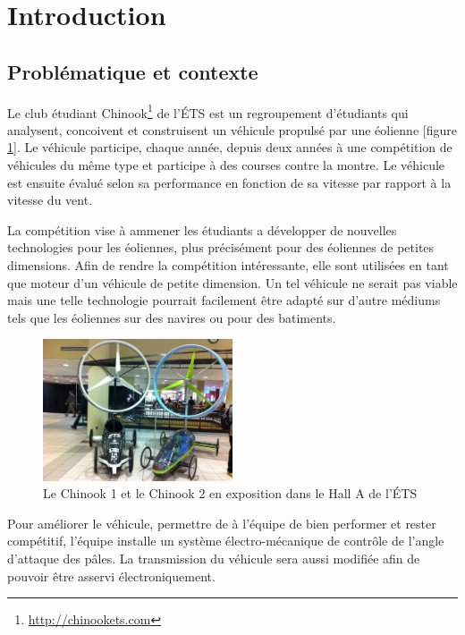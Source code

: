 \section{Introduction} %
\label{sec:Introduction}

\subsection{Problématique et contexte} %
\label{sub:prob_contexte}

Le club étudiant Chinook\footnote{\url{http://chinookets.com}} de l'ÉTS est un regroupement d'étudiants qui analysent, concoivent et construisent un véhicule propulsé par une éolienne [figure \ref{fig:chinookHall}]. Le véhicule participe, chaque année, depuis deux années à une compétition de véhicules du même type et participe à des courses contre la montre. Le véhicule est ensuite évalué selon sa performance en fonction de sa vitesse par rapport à la vitesse du vent.

La compétition vise à ammener les étudiants a développer de nouvelles technologies pour les éoliennes, plus précisément pour des éoliennes de petites dimensions. Afin de rendre la compétition intéressante, elle sont utilisées en tant que moteur d'un véhicule de petite dimension. Un tel véhicule ne serait pas viable mais une telle technologie pourrait facilement être adapté sur d'autre médiums tels que les éoliennes sur des navires ou pour des batiments.

\begin{figure}[H]
  \label{fig:chinookHall}
  \centering
  \includegraphics[width=0.5\textwidth]{images/chinook_1_2.jpg}
  \caption[Chinook 1 et 2]{Le Chinook 1 et le Chinook 2 en exposition dans le Hall A de l'ÉTS}
\end{figure}

Pour améliorer le véhicule, permettre de à l'équipe de bien performer et rester compétitif, l'équipe installe un système électro-mécanique de contrôle de l'angle d'attaque des pâles. La transmission du véhicule sera aussi modifiée afin de pouvoir être asservi électroniquement.

